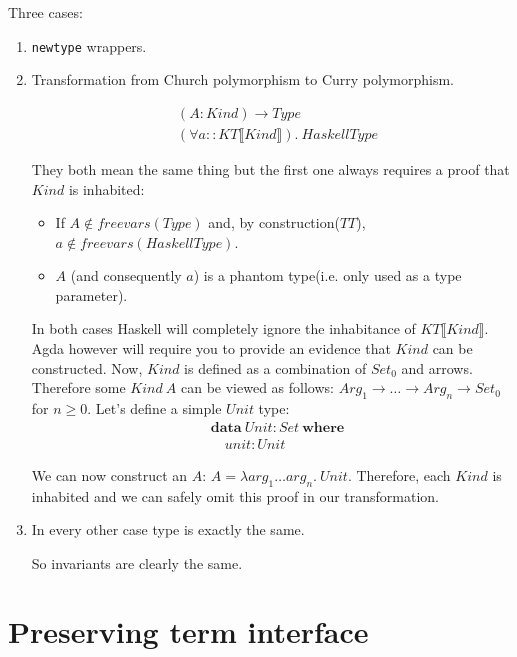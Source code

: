 Three cases:
\begin{enumerate}
\item \texttt{newtype} wrappers.



\item Transformation from Church polymorphism to Curry polymorphism.

\begin{align*}
&(A : Kind) \rightarrow Type \\
&(\forall a :: KT\llbracket Kind \rrbracket).\ HaskellType
\end{align*}

They both mean the same thing but the first one always requires a proof that
\(Kind\) is inhabited:

\begin{itemize}
\item If \(A \not\in freevars(Type)\) and, by construction(\(TT\)), \(a \not\in freevars(HaskellType)\).
\item \(A\) (and consequently \(a\)) is a phantom type(i.e. only used as a type parameter).
\end{itemize}

In both cases Haskell will completely ignore the inhabitance of \(KT\llbracket Kind \rrbracket\).
Agda however will require you to provide an evidence that \(Kind\) can be constructed. Now,
\(Kind\) is defined as a combination of \(Set_0\) and arrows. Therefore some \(Kind\ A\) can be viewed as
follows: \(Arg_1 \rightarrow \ldots \rightarrow Arg_n \rightarrow Set_0\) for \(n \ge 0\).
Let's define a simple \(Unit\) type:
\begin{align*}
   &\mathbf{data}\ Unit : Set\ \mathbf{where}\\
   &\quad unit : Unit
\end{align*}

We can now construct an \(A\): \(A = \lambda arg_1 \ldots arg_n.\ Unit\). Therefore, each \(Kind\)
is inhabited and we can safely omit this proof in our transformation.

\item In every other case type is exactly the same.

So invariants are clearly the same.
\end{enumerate}

\section{Preserving term interface}

